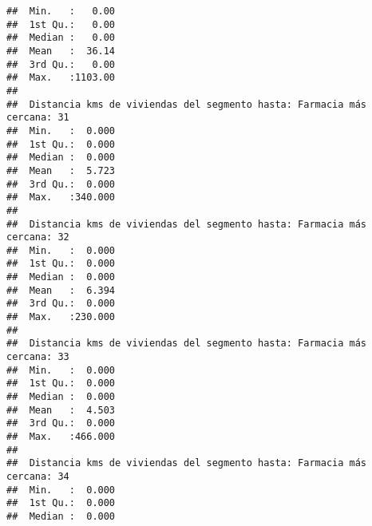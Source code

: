 \documentclass[11pt,]{article}
\begin{document}
\begin{verbatim}
##  Min.   :   0.00                                                        
##  1st Qu.:   0.00                                                        
##  Median :   0.00                                                        
##  Mean   :  36.14                                                        
##  3rd Qu.:   0.00                                                        
##  Max.   :1103.00                                                        
##                                                                         
##  Distancia kms de viviendas del segmento hasta: Farmacia más cercana: 31
##  Min.   :  0.000                                                        
##  1st Qu.:  0.000                                                        
##  Median :  0.000                                                        
##  Mean   :  5.723                                                        
##  3rd Qu.:  0.000                                                        
##  Max.   :340.000                                                        
##                                                                         
##  Distancia kms de viviendas del segmento hasta: Farmacia más cercana: 32
##  Min.   :  0.000                                                        
##  1st Qu.:  0.000                                                        
##  Median :  0.000                                                        
##  Mean   :  6.394                                                        
##  3rd Qu.:  0.000                                                        
##  Max.   :230.000                                                        
##                                                                         
##  Distancia kms de viviendas del segmento hasta: Farmacia más cercana: 33
##  Min.   :  0.000                                                        
##  1st Qu.:  0.000                                                        
##  Median :  0.000                                                        
##  Mean   :  4.503                                                        
##  3rd Qu.:  0.000                                                        
##  Max.   :466.000                                                        
##                                                                         
##  Distancia kms de viviendas del segmento hasta: Farmacia más cercana: 34
##  Min.   :  0.000                                                        
##  1st Qu.:  0.000                                                        
##  Median :  0.000                                                        

\end{verbatim}
\end{document}
